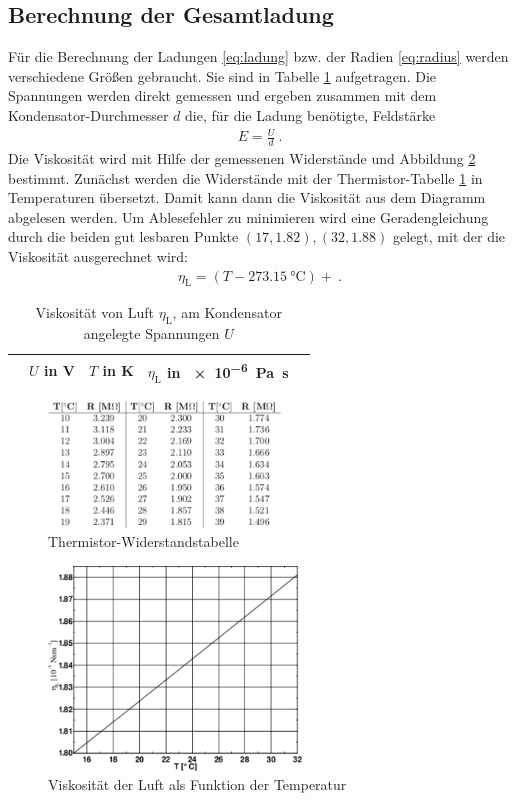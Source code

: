 \subsection{Berechnung der Gesamtladung}
Für die Berechnung der Ladungen \eqref{eq:ladung} bzw. der Radien \eqref{eq:radius} werden verschiedene Größen gebraucht. Sie sind in Tabelle \ref{fig:Konstanten} aufgetragen. 
Die Spannungen werden direkt gemessen und ergeben zusammen mit dem Kondensator-Durchmesser $d$ die, für die Ladung benötigte, Feldstärke
\begin{align}
	E = \frac{U}{d} \ .
\end{align}
Die Viskosität wird mit Hilfe der gemessenen Widerstände und Abbildung \ref{abb:Wid} bestimmt. Zunächst werden die Widerstände mit der Thermistor-Tabelle \ref{tab:Therm} in Temperaturen \glqq übersetzt\grqq. Damit kann dann die Viskosität aus dem Diagramm abgelesen werden. Um Ablesefehler zu minimieren wird eine Geradengleichung durch die beiden gut lesbaren Punkte $(17,1.82),(32,1.88)$ gelegt, mit der die Viskosität ausgerechnet wird:
\begin{align}
\eta_\text{L} = (T-\SI{273.15}{\celsius}) +  \ .
\end{align}
\begin{table}[h!]
	\centering
\begin{tabular}{ccccc}
	& $U$ in \si{\volt} & $T$ in \si{\kelvin} & $\eta_\text{L}$ in \SI{e-6}{\pascal\second} \\
	\hline
	
\end{tabular}
\caption{Viskosität von Luft $\eta_\text{L}$, am Kondensator angelegte Spannungen $U$}
\label{fig:Konstanten}
\end{table}
\begin{figure}[h!]
\centering
	\includegraphics[width=0.55\textwidth]{Termister.pdf}
	\caption{Thermistor-Widerstandstabelle}
	\label{tab:Therm}
\end{figure}
\begin{figure}[h!]
\centering
	\includegraphics[width=0.6\textwidth]{Diagramm.pdf}
	\caption{Viskosität der Luft als Funktion der Temperatur}
	\label{abb:Wid}
\end{figure} \\
